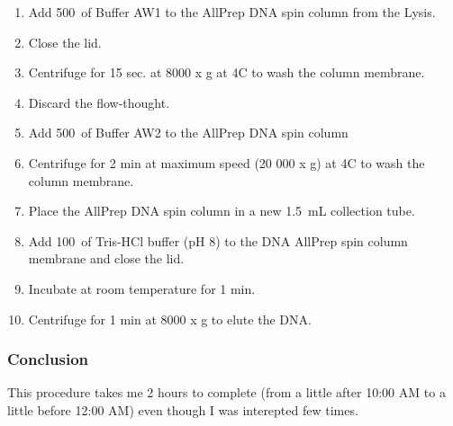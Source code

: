 \begin{enumerate}
\item Add 500~\uL of Buffer AW1 to the AllPrep DNA spin column from the Lysis.
\item Close the lid.
\item Centrifuge for 15 sec. at 8000 x g at 4\degree C to wash the column membrane.
\item Discard the flow-thought.
\item Add 500~\uL of Buffer AW2 to the AllPrep DNA spin column
\item Centrifuge for 2 min at maximum speed (20 000 x g) at 4\degree C to wash the column membrane.
\item Place the AllPrep DNA spin column in a new 1.5~mL collection tube.
\item Add 100~\uL of Tris-HCl buffer (pH 8) to the DNA AllPrep spin column membrane and close the lid.
\item Incubate at room temperature for 1 min.
\item Centrifuge for 1 min at 8000 x g to elute the DNA.
\end{enumerate}

\subsubsection{Conclusion}

This procedure takes me 2 hours to complete (from a little after 10:00 AM to a little before 12:00 AM) even though I was interepted few times.
